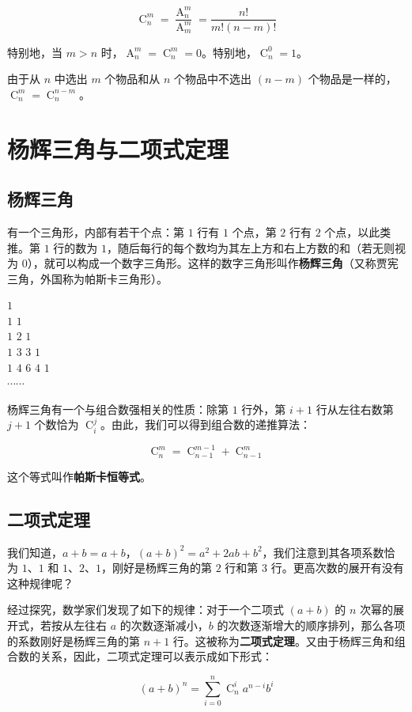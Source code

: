 \[
\operatorname{C}_n^m = \frac{\operatorname{A}_n^m}{\operatorname{A}_m^m} = \frac{n!}{m!(n-m)!}
\]

特别地，当 $m > n$ 时，$\operatorname{A}_n^m = \operatorname{C}_n^m = 0$。特别地，$\operatorname{C}_n^0 = 1$。

由于从 $n$ 中选出 $m$ 个物品和从 $n$ 个物品中不选出 $(n-m)$ 个物品是一样的，$\operatorname{C}_n^m = \operatorname{C}_n^{n-m}$。 

\section{杨辉三角与二项式定理}

\subsection{杨辉三角}

有一个三角形，内部有若干个点：第 $1$ 行有 $1$ 个点，第 $2$ 行有 $2$ 个点，以此类推。第 $1$ 行的数为 $1$，随后每行的每个数均为其左上方和右上方数的和（若无则视为 $0$），就可以构成一个数字三角形。这样的数字三角形叫作\textbf{杨辉三角}（又称贾宪三角，外国称为帕斯卡三角形）。

\begin{center}
$1$\\
$1$ \quad $1$\\
$1$ \quad $2$ \quad $1$\\
$1$ \quad $3$ \quad $3$ \quad $1$\\
$1$ \quad $4$ \quad $6$ \quad $4$ \quad $1$\\
$\cdots\cdots$
\end{center}

杨辉三角有一个与组合数强相关的性质：除第 $1$ 行外，第 $i+1$ 行从左往右数第 $j+1$ 个数恰为 $\operatorname{C}_i^j$。由此，我们可以得到组合数的递推算法：

\[
\operatorname{C}_n^m = \operatorname{C}_{n-1}^{m-1} + \operatorname{C}_{n-1}^m
\]

这个等式叫作\textbf{帕斯卡恒等式}。

\subsection{二项式定理}

我们知道，$a+b = a+b$，$(a+b)^2 = a^2 + 2ab + b^2$，我们注意到其各项系数恰为 $1$、$1$ 和 $1$、$2$、$1$，刚好是杨辉三角的第 $2$ 行和第 $3$ 行。更高次数的展开有没有这种规律呢？

经过探究，数学家们发现了如下的规律：对于一个二项式 $(a+b)$ 的 $n$ 次幂的展开式，若按从左往右 $a$ 的次数逐渐减小，$b$ 的次数逐渐增大的顺序排列，那么各项的系数刚好是杨辉三角的第 $n+1$ 行。这被称为\textbf{二项式定理}。又由于杨辉三角和组合数的关系，因此，二项式定理可以表示成如下形式：

\[
(a+b)^n = \sum\limits_{i=0}^n \operatorname{C}_n^i a^{n-i} b^i
\]